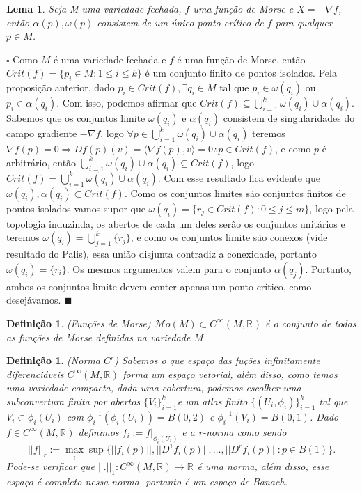 \documentclass[12pt]{book}
\newtheorem{lema}[teorema]{Lema}
\newtheorem{definicao}[teorema]{Definição}
\newenvironment{prova}[1]{$\square$ #1}{\hfill$\blacksquare$}
\newcommand{\real}[1]{\mathbb{R}^{#1}}
\newcommand{\innerprod}[2]{\langle #1, #2 \rangle}
\newcommand{\morsefunc}[1]{\mathcal{M}o(#1)}
\newcommand{\suavefunc}[1]{C^{\infty}(#1, \real{})}
\begin{document}
	\begin{lema}
		Seja M uma variedade fechada, $f$ uma função de Morse e $X =-\nabla f$, então $\alpha(p), \omega(p)$ consistem de um único ponto crítico de $f$ para qualquer $p \in M$.
	\end{lema}
	\begin{prova}
		Como $M$ é uma variedade fechada e $f$ é uma função de Morse, então $Crit(f) = \{p_{i} \in M: 1\leq i \leq k \}$ é um conjunto finito de pontos isolados. Pela proposição anterior, dado $p_{i} \in Crit(f), \exists q_{i} \in M$ tal que $p_{i} \in \omega(q_{i})$ ou $p_{i} \in \alpha(q_{i})$. Com isso, podemos afirmar que $Crit(f) \subseteq \bigcup_{i=1}^{k}\omega(q_{i}) \cup \alpha(q_{i})$. Sabemos que os conjuntos limite $\omega(q_{i})$ e $\alpha(q_{i})$ consistem de singularidades do campo gradiente $-\nabla f$, logo $\forall p \in \bigcup_{i=1}^{k}\omega(q_{i}) \cup \alpha(q_{i})$ teremos $\nabla f(p) = 0 \Rightarrow Df(p)(v) = \innerprod{\nabla f(p)}{v} = 0 \therefore p \in Crit(f)$, e como $p$ é arbitrário, então $\bigcup_{i=1}^{k}\omega(q_{i}) \cup \alpha(q_{i}) \subseteq Crit(f)$, logo $Crit(f) = \bigcup_{i=1}^{k}\omega(q_{i}) \cup \alpha(q_{i})$. Com esse resultado fica evidente que $\omega(q_{i}), \alpha(q_{i}) \subset Crit(f)$. Como os conjuntos limites são conjuntos finitos de pontos isolados vamos supor que $\omega(q_{i}) = \{r_{j} \in Crit(f): 0\leq j \leq m\}$, logo pela topologia induzinda, os abertos de cada um deles serão os conjuntos unitários e teremos $\omega(q_{i}) = \bigcup_{j=1}^{k} \{r_{j}\} $, e como os conjuntos limite são conexos (vide resultado do Palis), essa união disjunta contradiz a conexidade, portanto $\omega(q_{i}) = \{r_{i}\}$. Os mesmos argumentos valem para o conjunto $\alpha(q_{j})$. Portanto, ambos os conjuntos limite devem conter apenas um ponto crítico, como desejávamos.
	\end{prova}
	
	\begin{definicao}
		(Funções de Morse) $\morsefunc{M} \subset \suavefunc{M}$ é o conjunto de todas as funções de Morse definidas na variedade $M$.
	\end{definicao}
	
	\begin{definicao}
		(Norma $C^{r}$) Sabemos o que espaço das fuções infinitamente diferenciáveis $\suavefunc{M}$ forma um espaço vetorial, além disso, como temos uma variedade compacta, dada uma cobertura, podemos escolher uma subconvertura finita por abertos $\{V_{i}\}_{i=1}^{k}$e um atlas finito $\{(U_{i}, \phi_{i})\}_{i=1}^{k}$ tal que $V_{i} \subset \phi_{i}(U_{i})$ com $\phi_{i}^{-1}(\phi_{i}(U_{i})) = B(0,2)$ e $\phi_{i}^{-1}(V_{i}) = B(0,1)$. Dado $f \in \suavefunc{M}$ definimos $f_{i} := f|_{\phi_{i}(U_{i})}$ e a \textit{r-norma} como sendo 
		$$
		||f||_{r} := \max_{i} \sup\{||f_{i}(p)||, ||D^{1}f_{i}(p)||, \dots, ||D^{r}f_{i}(p)||: p \in B(1)\}.
		$$
		Pode-se verificar que $||.||_{1}: \suavefunc{M} \to \real{}$ é uma norma, além disso, esse espaço é completo nessa norma, portanto é um \textit{espaço de Banach}.
	\end{definicao}
	
\end{document}
